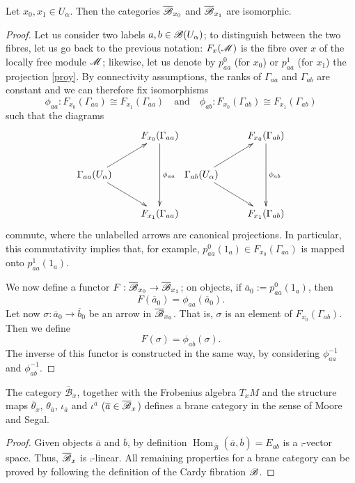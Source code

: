 \begin{lemma}
Let $x_0,x_1\in U_\alpha$. Then the categories $\overline{\mathscr{B}}_{x_0}$ and $\overline{\mathscr{B}}_{x_1}$ are isomorphic.
\end{lemma}
\begin{proof}
Let us consider two labels $a,b\in \mathscr{B}(U_\alpha )$; to distinguish between the two fibres, let us go back to the previous notation: $F_x(\mathscr{M})$ is the fibre over $x$ of the locally free module $\mathscr{M}$; likewise, let us denote by $p_{aa}^0$ (for $x_0$) or $p_{aa}^1$ (for $x_1$) the projection \eqref{proy}. By connectivity assumptions, the ranks of $\Gamma_{aa}$ and $\Gamma_{ab}$ are constant and we can therefore fix isomorphisms
$$\phi_{aa}:F_{x_0}(\Gamma_{aa})\cong F_{x_1}(\Gamma_{aa})\quad \text{and} \quad \phi_{ab} :F_{x_0}(\Gamma_{ab})\cong F_{x_1}(\Gamma_{ab})$$
such that the diagrams
$$
\xymatrix{
 & F_{x_0}(\Gamma_{aa}) \ar[dd]^{\phi_{aa}} \\
\Gamma_{aa}(U_\alpha )\ar[ur] \ar[dr] & \\
 & F_{x_1}(\Gamma_{aa})}
\xymatrix{
 & F_{x_0}(\Gamma_{ab}) \ar[dd]^{\phi_{ab}} \\
\Gamma_{ab}(U_\alpha )\ar[ur] \ar[dr] & \\
 & F_{x_1}(\Gamma_{ab})}
$$
commute, where the unlabelled arrows are canonical projections. In particular, this commutativity implies that, for example, $p_{aa}^0(1_a)\in F_{x_0}(\Gamma_{aa})$ is mapped onto $p_{aa}^1(1_a)$.

We now define a functor $F:\overline{\mathscr{B}}_{x_0}\to \overline{\mathscr{B}}_{x_1}$; on objects, if $\overline{a}_0:=p_{aa}^0(1_a)$, then
$$F(\overline{a}_0)=\phi_{aa}(\overline{a}_0).$$
Let now $\sigma :\overline{a}_0\to \overline{b}_0$ be an arrow in $\overline{\mathscr{B}}_{x_0}$. That is, $\sigma$ is an element of $F_{x_0}(\Gamma_{ab})$. Then we define
$$F (\sigma )=\phi_{ab}(\sigma ).$$
The inverse of this functor is constructed in the same way, by considering $\phi_{aa}^{-1}$ and $\phi_{ab}^{-1}$.
\end{proof}

\begin{theorem}\label{ms_over_point}
The category $\overline{\mathscr{B}}_x$, together with the Frobenius algebra $T_xM$ and the structure maps $\overline{\theta}_x$, $\theta_{\overline{a}}$, $\iota_{\overline{a}}$ and $\iota^{\overline{a}}$ ($\overline{a}\in \overline{\mathscr{B}}_x$) defines a brane category in the sense of Moore and Segal.
\end{theorem}
\begin{proof}
Given objects $\overline{a}$ and $\overline{b}$, by definition $\operatorname{Hom}_{\overline{\mathscr{B}}}(\overline{a},\overline{b})=E_{ab}$ is a $\comp$-vector space. Thus, $\overline{\mathscr{B}}_x$ is $\comp$-linear. All remaining properties for a brane category can be proved by following the definition of the Cardy fibration $\mathscr{B}$.
\end{proof}

